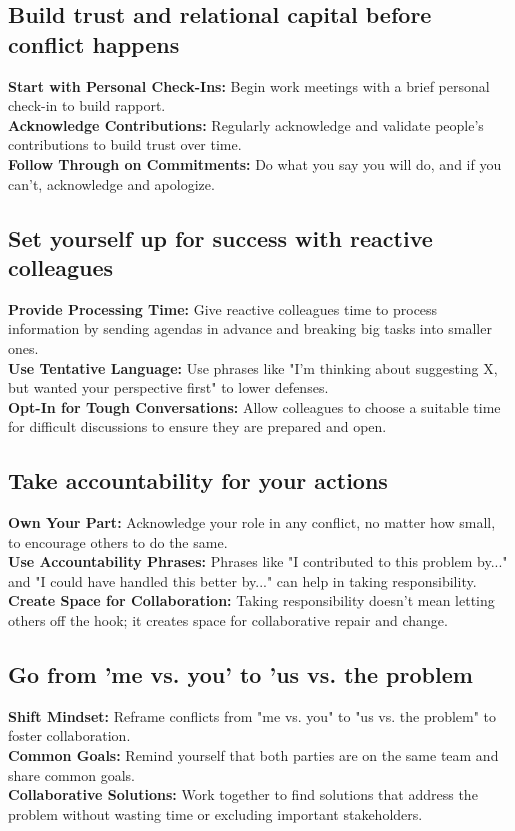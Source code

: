 \documentclass[12pt]{article}
\begin{document}
\subsection{Build trust and relational capital before conflict happens}
\textbf{Start with Personal Check-Ins:}  Begin work meetings with a brief personal check-in to build rapport.\\
\textbf{Acknowledge Contributions:}  Regularly acknowledge and validate people's contributions to build trust over time.\\
\textbf{Follow Through on Commitments:}  Do what you say you will do, and if you can't, acknowledge and apologize.

\subsection{Set yourself up for success with reactive colleagues}
\textbf{Provide Processing Time:}  Give reactive colleagues time to process information by sending agendas in advance and breaking big tasks into smaller ones.\\
\textbf{Use Tentative Language:} Use phrases like "I'm thinking about suggesting X, but wanted your perspective first" to lower defenses.\\
\textbf{Opt-In for Tough Conversations:}  Allow colleagues to choose a suitable time for difficult discussions to ensure they are prepared and open.

\subsection{Take accountability for your actions}
\textbf{Own Your Part:}  Acknowledge your role in any conflict, no matter how small, to encourage others to do the same.\\
\textbf{Use Accountability Phrases:} Phrases like "I contributed to this problem by..." and "I could have handled this better by..." can help in taking responsibility.\\
\textbf{Create Space for Collaboration:}  Taking responsibility doesn't mean letting others off the hook; it creates space for collaborative repair and change.

\subsection{Go from 'me vs. you' to 'us vs. the problem}
\textbf{Shift Mindset:}  Reframe conflicts from "me vs. you" to "us vs. the problem" to foster collaboration.\\
\textbf{Common Goals:} Remind yourself that both parties are on the same team and share common goals.\\
\textbf{Collaborative Solutions:} Work together to find solutions that address the problem without wasting time or excluding important stakeholders.
\end{document}
